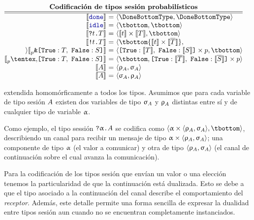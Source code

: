\begin{center}
$\displaystyle
  \begin{array}{@{}c@{}}
    \textbf{Codificación de tipos sesión probabilísticos} \\
    \hline
    \hline
    \begin{array}[t]{@{}r@{~}c@{~}l@{}}
      \encfun\Done
      & = &
      \tsession\DoneBottomType\DoneBottomType
      \\
      \encfun\Idle
      & = &
      \tsession\tbottom\tbottom
      \\
      \encfun{\In\Type\SessionType}
      & = &
      \tsession{\encfun\Type\tmul\encfun\SessionType}\tbottom
      \\
      \encfun{\Out\Type\SessionType}
      & = &
      \tsession\tbottom{\encfun\Type\tmul\encfun{\dual\SessionType}}
      \\
      \encfun{\BinaryPBranch[p]{\SessionTypeT}{\SessionTypeS}}
      & = &
      \tsession{\BinaryLabels{\encfun{\SessionTypeT}}{\encfun{\SessionTypeS}}\tmul p}\tbottom
      \\
      \encfun{\BinaryPChoice[p]{\SessionTypeT}{\SessionTypeS}}
      & = &
      \tsession{\tbottom}{\BinaryLabels{\encfun{\dual\SessionTypeT}}{\encfun{\dual\SessionTypeS}}\tmul p}
      \\
      \encfun\etvar
      & = &
      \tsession{\renc\etvar}{\senc\etvar}
      \\
      \encfun{\sdual\etvar}
      & = &
      \tsession{\senc\etvar}{\renc\etvar}
    \end{array}
  \end{array}
$
\end{center}

extendida homomórficamente a todos los tipos. Asumimos que para cada variable
de tipo sesión $A$ existen dos variables de tipo $\upsigma_{A}$ y
$\uprho_{A}$ distintas entre sí y de cualquier tipo de variable $\upalpha$.

Como ejemplo, el tipo sessión ${\texttt{\upshape?}}{\upalpha}\texttt{\upshape.}A$ se codifica como
$\tsession{\tvar \tmul \tsession{\renc\etvar}{\senc\etvar}}\tbottom$,
describiendo un canal para recibir un mensaje de tipo $\upalpha \times
\langle\uprho_{A},\upsigma_{A}\rangle$; una componente de tipo $\upalpha$ (el valor a
comunicar) y otra de tipo $\langle\uprho_{A},\upsigma_{A}\rangle$ (el canal de
continuación sobre el cual avanza la comunicación).

Para la codificación de los tipos sesión que envían un valor o una elección
tenemos la particularidad de que la continuación está dualizada. Esto se debe a
que el tipo asociado a la continuación del canal describe el comportamiento del
\emph{receptor}. Además, este detalle permite una forma sencilla de expresar la
dualidad entre tipos sesión aun cuando no se encuentran completamente
instanciados.

